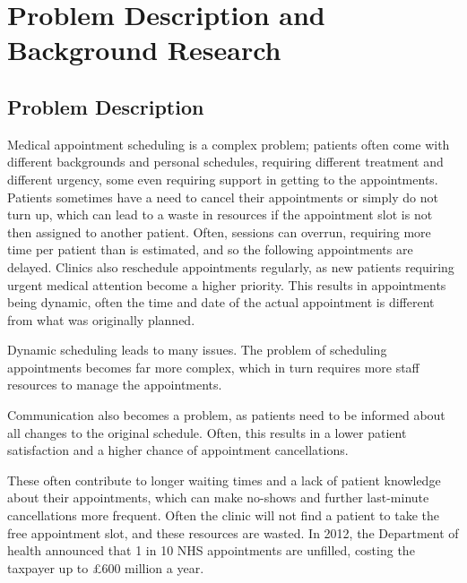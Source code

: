 
\chapter{Problem Description and Background Research} %

\label{Chapter3} %



\section{Problem Description}

Medical appointment scheduling is a complex problem; patients often come with different backgrounds and personal schedules, requiring different treatment and different urgency, some even requiring support in getting to the appointments. Patients sometimes have a need to cancel their appointments or simply do not turn up, which can lead to a waste in resources if the appointment slot is not then assigned to another patient. Often, sessions can overrun, requiring more time per patient than is estimated, and so the following appointments are delayed. Clinics also reschedule appointments regularly, as new patients requiring urgent medical attention become a higher priority. This results in appointments being dynamic, often the time and date of the actual appointment is different from what was originally planned.

Dynamic scheduling leads to many issues. The problem of scheduling appointments becomes far more complex, which in turn requires more staff resources to manage the appointments.

Communication also becomes a problem, as patients need to be informed about all changes to the original schedule. Often, this results in a lower patient satisfaction and a higher chance of appointment cancellations.

These often contribute to longer waiting times and a lack of patient knowledge about their appointments, which can make no-shows and further last-minute cancellations more frequent. Often the clinic will not find a patient to take the free appointment slot, and these resources are wasted. In 2012, the Department of health announced that 1 in 10 NHS appointments are unfilled, costing the taxpayer up to £600 million a year.\cite{NHSAppsMissed}

